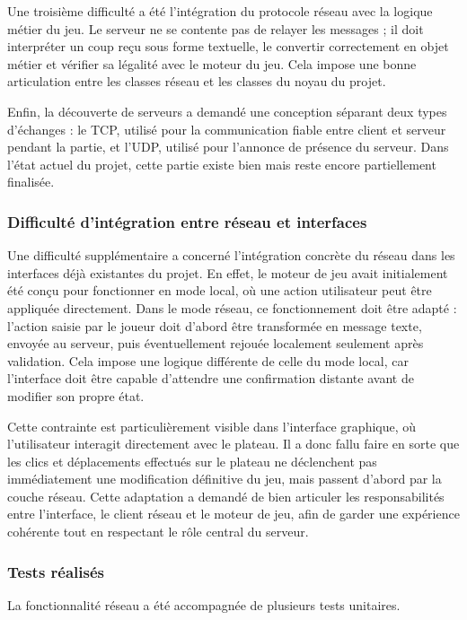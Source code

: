 \documentclass[a4paper]{article}
\begin{document}
Une troisième difficulté a été l’intégration du protocole réseau avec la logique métier du jeu. Le serveur ne se contente pas de relayer les messages ; il doit interpréter un coup reçu sous forme textuelle, le convertir correctement en objet métier et vérifier sa légalité avec le moteur du jeu. Cela impose une bonne articulation entre les classes réseau et les classes du noyau du projet.

Enfin, la découverte de serveurs a demandé une conception séparant deux types d’échanges : le TCP, utilisé pour la communication fiable entre client et serveur pendant la partie, et l’UDP, utilisé pour l’annonce de présence du serveur. Dans l’état actuel du projet, cette partie existe bien mais reste encore partiellement finalisée.


\subsubsection{Difficulté d’intégration entre réseau et interfaces}
Une difficulté supplémentaire a concerné l’intégration concrète du réseau dans les interfaces déjà existantes du projet. En effet, le moteur de jeu avait initialement été conçu pour fonctionner en mode local, où une action utilisateur peut être appliquée directement. Dans le mode réseau, ce fonctionnement doit être adapté : l’action saisie par le joueur doit d’abord être transformée en message texte, envoyée au serveur, puis éventuellement rejouée localement seulement après validation. Cela impose une logique différente de celle du mode local, car l’interface doit être capable d’attendre une confirmation distante avant de modifier son propre état.

Cette contrainte est particulièrement visible dans l’interface graphique, où l’utilisateur interagit directement avec le plateau. Il a donc fallu faire en sorte que les clics et déplacements effectués sur le plateau ne déclenchent pas immédiatement une modification définitive du jeu, mais passent d’abord par la couche réseau. Cette adaptation a demandé de bien articuler les responsabilités entre l’interface, le client réseau et le moteur de jeu, afin de garder une expérience cohérente tout en respectant le rôle central du serveur.



\subsubsection{Tests réalisés}

La fonctionnalité réseau a été accompagnée de plusieurs tests unitaires.
\end{document}
